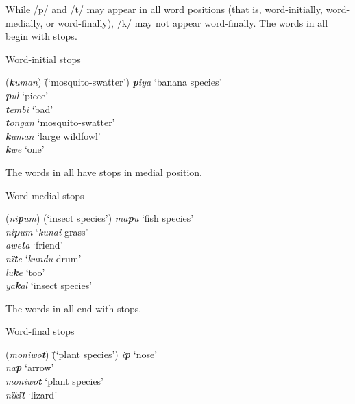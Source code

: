 While /p/ and /t/ may appear in all word positions (that is, word-initially, word-medially, or word-finally), /k/ may not appear word-finally. The words in  all begin with  stops.

\ea%
    \label{ex:phon:4}
            Word-initial  stops\\
\begin{tabbing}
{(\textit{\textbf{k}uman})} \= {(‘mosquito-swatter’)}\kill
{\textit{\textbf{p}iya}} \> {‘banana species’}\\
{\textit{\textbf{p}ul}} \> {‘piece’}\\
{\textit{\textbf{t}embi}} \> {‘bad’}\\
{\textit{\textbf{t}ongan}} \> {‘mosquito-swatter’}\\
{\textit{\textbf{k}uman}} \> {‘large wildfowl’}\\
{\textit{\textbf{k}we}} \> {‘one’}
\end{tabbing}
\z

The words in  all have  stops in medial position.

\ea%
    \label{ex:phon:5}
            Word-medial  stops\\
\begin{tabbing}
{(\textit{ni\textbf{p}um})} \= {(‘insect species’)}\kill
{\textit{ma\textbf{p}u}} \> {‘fish species’}\\
{\textit{ni\textbf{p}um}} \> {‘\textit{kunai} grass’}\\
{\textit{awe\textbf{t}a}} \> {‘friend’}\\
{\textit{nï\textbf{t}e}} \> {‘\textit{kundu} drum’}\\
{\textit{lu\textbf{k}e}} \> {‘too’}\\
{\textit{ya\textbf{k}al}} \> {‘insect species’}
\end{tabbing}
\z

\newpage

The words in  all end with  stops.


\ea%
    \label{ex:phon:6}
            Word-final  stops\\
\begin{tabbing}
{(\textit{moniwo\textbf{t}})} \= {(‘plant species’)}\kill
{\textit{i\textbf{p}}} \> {‘nose’}\\
{\textit{na\textbf{p}}} \> {‘arrow’}\\
{\textit{moniwo\textbf{t}}} \> {‘plant species’}\\
{\textit{nïkï\textbf{t}}} \> {‘lizard’}
\end{tabbing}
\z


